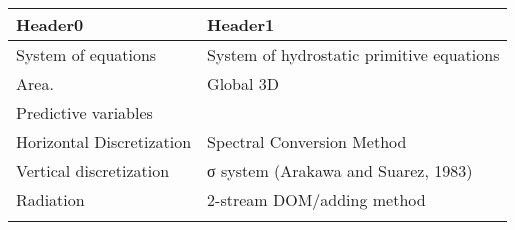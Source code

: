 \begin{longtable}[]{@{}ll@{}}
\toprule
\begin{minipage}[b]{0.47\columnwidth}\raggedright
Header0\strut
\end{minipage} & \begin{minipage}[b]{0.47\columnwidth}\raggedright
Header1\strut
\end{minipage}\tabularnewline
\midrule
\endhead
\begin{minipage}[t]{0.47\columnwidth}\raggedright
System of equations\strut
\end{minipage} & \begin{minipage}[t]{0.47\columnwidth}\raggedright
System of hydrostatic primitive equations\strut
\end{minipage}\tabularnewline
\begin{minipage}[t]{0.47\columnwidth}\raggedright
Area.\strut
\end{minipage} & \begin{minipage}[t]{0.47\columnwidth}\raggedright
Global 3D\strut
\end{minipage}\tabularnewline
\begin{minipage}[t]{0.47\columnwidth}\raggedright
Predictive variables\strut
\end{minipage} & \begin{minipage}[t]{0.47\columnwidth}\raggedright
\strut
\end{minipage}\tabularnewline
\begin{minipage}[t]{0.47\columnwidth}\raggedright
Horizontal Discretization\strut
\end{minipage} & \begin{minipage}[t]{0.47\columnwidth}\raggedright
Spectral Conversion Method\strut
\end{minipage}\tabularnewline
\begin{minipage}[t]{0.47\columnwidth}\raggedright
Vertical discretization\strut
\end{minipage} & \begin{minipage}[t]{0.47\columnwidth}\raggedright
σ system (Arakawa and Suarez, 1983)\strut
\end{minipage}\tabularnewline
\begin{minipage}[t]{0.47\columnwidth}\raggedright
Radiation\strut
\end{minipage} & \begin{minipage}[t]{0.47\columnwidth}\raggedright
2-stream DOM/adding method\strut
\end{minipage}\tabularnewline
\begin{minipage}[t]{0.47\columnwidth}\raggedright

\end{minipage}
\end{longtable}
